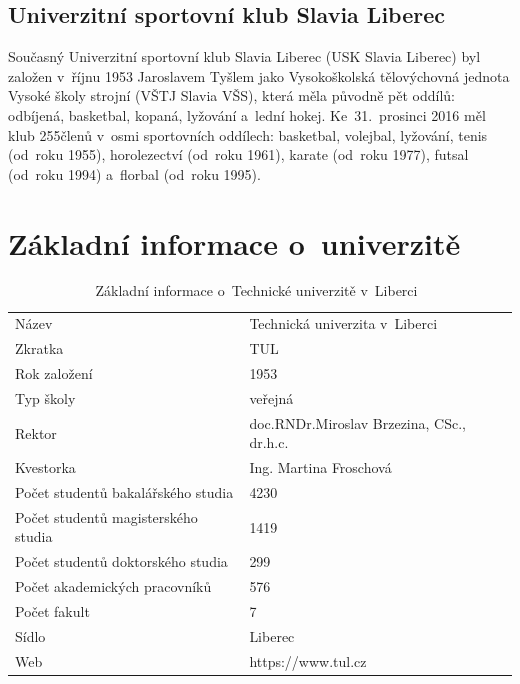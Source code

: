 \documentclass[a4paper,12pt,fonts]{./tulpackage/tularticle}
\begin{document}
\clearpage

\subsection{Univerzitní sportovní klub Slavia Liberec}

Současný Univerzitní sportovní klub Slavia Liberec (USK Slavia Liberec) byl založen v~říjnu 1953 Jaroslavem Tyšlem jako Vysokoškolská tělovýchovná jednota Vysoké školy strojní (VŠTJ Slavia VŠS), která měla původně pět oddílů: odbíjená, basketbal, kopaná, lyžování a~lední hokej. Ke~31.~prosinci 2016 měl klub 255\thinspace{}členů v~osmi sportovních oddílech: basketbal, volejbal, lyžování, tenis (od~roku 1955), horolezectví (od~roku 1961), karate (od~roku 1977), futsal (od~roku 1994) a~florbal (od~roku 1995).~\cite{golka} %

\clearpage

\section{Základní informace o~univerzitě}

\vspace{-0.6em}
\begin{table}[H]
\centering
\small
\begin{tabular}{ll}
\midrule
Název & Technická univerzita v~Liberci \\
Zkratka & TUL \\
Rok založení & 1953 \\
Typ školy & veřejná \\
Rektor & doc.\thinspace{}RNDr.\thinspace{}Miroslav Brzezina, CSc., dr.\thinspace{}h.\thinspace{}c. \\ %
Kvestorka & Ing. Martina Froschová \\
Počet studentů bakalářského studia & 4230 \\
Počet studentů magisterského studia & 1419 \\
Počet studentů doktorského studia & 299 \\
Počet akademických pracovníků & 576 \\
Počet fakult & 7 \\
Sídlo & Liberec \\
Web & https://www.tul.cz \\
\bottomrule
\end{tabular}
\caption{Základní informace o~Technické univerzitě v~Liberci~\cite{vyrocnizprava}}
\label{tab:zakladni_informace}
\end{table}
\vspace{0.8em}
\end{document}
